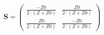 \begin{equation} \mathbf{S} = \left(\begin{array}{cc} \frac{-Z0}{2\cdot \left(Z+Z0\right)} & \frac{Z0}{2\cdot \left(Z+Z0\right)} \\ \frac{Z0}{2\cdot \left(Z+Z0\right)} & \frac{-Z0}{2\cdot \left(Z+Z0\right)} \end{array}\right) \end{equation}
